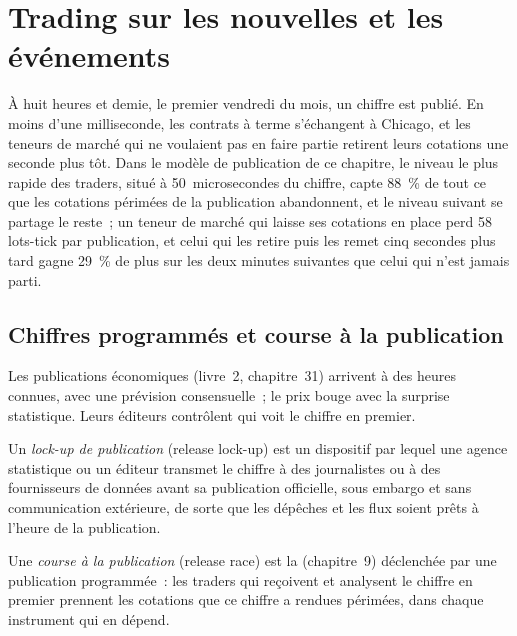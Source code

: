 \chapter{Trading sur les nouvelles et les événements}\label{ch:hf:news-and-event-trading}

À huit heures et demie, le premier vendredi du mois, un chiffre est publié. En moins d'une milliseconde, les contrats à terme s'échangent à Chicago, et les teneurs de marché
qui ne voulaient pas en faire partie retirent leurs cotations une seconde plus tôt. Dans le modèle de publication de ce chapitre, le niveau le plus rapide des traders, situé
à 50~microsecondes du chiffre, capte 88~\% de tout ce que les cotations périmées de la publication abandonnent, et le niveau suivant se partage le reste~; un teneur de marché qui
laisse ses cotations en place perd 58 lots-tick par publication, et celui qui les retire puis les remet cinq secondes plus tard gagne 29~\% de plus sur les deux minutes suivantes que
celui qui n'est jamais parti.

\section{Chiffres programmés et course à la publication}

Les publications économiques (livre~2, chapitre~31) arrivent à des heures connues, avec une prévision consensuelle~; le prix bouge avec la
surprise statistique. Leurs éditeurs contrôlent qui voit le chiffre en premier.

\begin{definition}\label{def:hf:news-and-event-trading:lockup}
Un \emph{lock-up de publication} (release lock-up) est un dispositif par lequel une agence statistique ou un éditeur transmet le chiffre à des journalistes ou à des fournisseurs de
données avant sa publication officielle, sous embargo et sans communication extérieure, de sorte que les dépêches et les flux soient prêts
à l'heure de la publication.
\end{definition}

\begin{definition}\label{def:hf:news-and-event-trading:race}
Une \emph{course à la publication} (release race) est la  (chapitre~9) déclenchée par une publication programmée~: les traders qui reçoivent et analysent le
chiffre en premier prennent les cotations que ce chiffre a rendues périmées, dans chaque instrument qui en dépend.
\end{definition}


